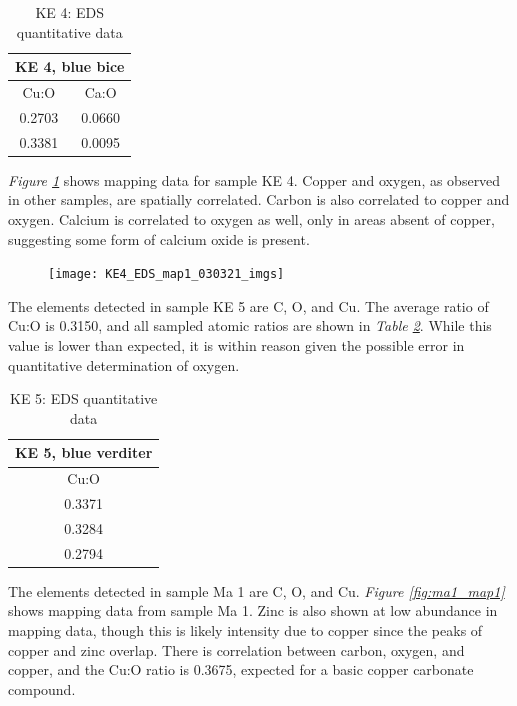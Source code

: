 \begin{table}[H]
\caption{KE 4: EDS quantitative data}
\centering
\label{table:ke4_ratios}
\begin{tabular}{c c}
\toprule
\multicolumn{2}{c}{KE 4, blue bice} \\
\midrule
Cu:O & Ca:O \\
\midrule
0.2703 & 0.0660 \\
0.3381 & 0.0095 \\
\bottomrule
\end{tabular}
\end{table}

\textit{Figure \ref{fig:ke4_map1}} shows mapping data for sample KE 4. Copper and oxygen, as observed in other samples, are spatially correlated. Carbon is also correlated to copper and oxygen. Calcium is correlated to oxygen as well, only in areas absent of copper, suggesting some form of calcium oxide is present.

\begin{figure}[H]
\centering
  \texttt{[image: KE4\_EDS\_map1\_030321\_imgs]}
\label{fig:ke4_map1}
\end{figure}


The elements detected in sample KE 5 are C, O, and Cu. The average ratio of Cu:O is 0.3150, and all sampled atomic ratios are shown in \textit{Table \ref{table:ke5_ratios}}. While this value is lower than expected, it is within reason given the possible error in quantitative determination of oxygen.

\begin{table}[H]
\caption{KE 5: EDS quantitative data}
\centering
\label{table:ke5_ratios}
\begin{tabular}{c}
\toprule
KE 5, blue verditer \\
\midrule
Cu:O \\
\midrule
0.3371 \\
0.3284 \\
0.2794 \\
\bottomrule
\end{tabular}
\end{table}


The elements detected in sample Ma 1 are C, O, and Cu. \textit{Figure \ref{fig:ma1_map1}} shows mapping data from sample Ma 1. Zinc is also shown at low abundance in mapping data, though this is likely intensity due to copper since the peaks of copper and zinc overlap. There is correlation between carbon, oxygen, and copper, and the Cu:O ratio is 0.3675, expected for a basic copper carbonate compound. 

